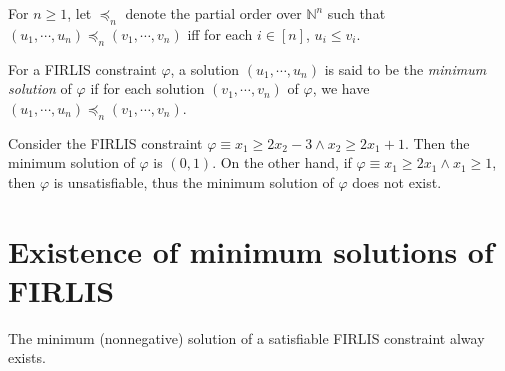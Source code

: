 \documentclass[runningheads]{llncs}
\newcommand\natnum{\mathbb{N}}
\newcommand\firlis{FIRLIS}
\begin{document}
For $n \ge 1$, let $\preceq_n$ denote the partial order over $\natnum^n$ such that $(u_1, \cdots, u_n) \preceq_n (v_1, \cdots, v_n)$ iff for each $i \in [n]$, $u_i \le v_i$. 

For a {\firlis} constraint $\varphi$, a solution $(u_1, \cdots, u_n)$ is said to be the \emph{minimum solution} of $\varphi$ if for each solution $(v_1, \cdots, v_n)$ of $\varphi$, we have  $(u_1, \cdots, u_n) \preceq_n (v_1, \cdots, v_n)$.

\begin{example}
Consider the {\firlis} constraint $\varphi \equiv x_1 \ge 2 x_2 - 3 \wedge x_2 \ge 2x_1 + 1$. Then the minimum solution of $\varphi$ is $(0, 1)$. On the other hand, if $\varphi \equiv x_1 \ge 2 x_1 \wedge x_1 \ge 1$, then $\varphi$ is unsatisfiable, thus the minimum solution of $\varphi$ does not exist. 
\end{example}

\section{Existence of minimum solutions of FIRLIS}

\begin{proposition}\label{prop-min-sol}
The minimum (nonnegative) solution of a satisfiable {\firlis} constraint alway exists. 
\end{proposition}
\end{document}
